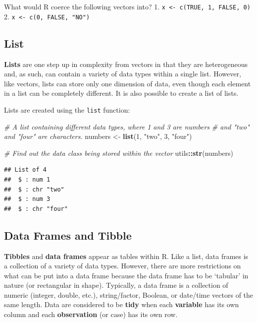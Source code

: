 \documentclass[
]{book}
\newenvironment{Shaded}{\begin{snugshade}}{\end{snugshade}}
\newcommand{\CommentTok}[1]{\textcolor[rgb]{0.56,0.35,0.01}{\textit{#1}}}
\newcommand{\DecValTok}[1]{\textcolor[rgb]{0.00,0.00,0.81}{#1}}
\newcommand{\FunctionTok}[1]{\textcolor[rgb]{0.13,0.29,0.53}{\textbf{#1}}}
\newcommand{\NormalTok}[1]{#1}
\newcommand{\OtherTok}[1]{\textcolor[rgb]{0.56,0.35,0.01}{#1}}
\newcommand{\SpecialCharTok}[1]{\textcolor[rgb]{0.81,0.36,0.00}{\textbf{#1}}}
\newcommand{\StringTok}[1]{\textcolor[rgb]{0.31,0.60,0.02}{#1}}
\begin{document}
What would R coerce the following vectors into?
1. \texttt{x\ \textless{}-\ c(TRUE,\ 1,\ FALSE,\ 0)}
2. \texttt{x\ \textless{}-\ c(0,\ FALSE,\ "NO")}

\subsection{List}\label{sec:list}

\textbf{Lists} are one step up in complexity from vectors in that they are heterogeneous and, as such, can contain a variety of data types within a single list. However, like vectors, lists can store only one dimension of data, even though each element in a list can be completely different. It is also possible to create a list of lists.

Lists are created using the \texttt{list} function:

\begin{Shaded}
\begin{Highlighting}[]
\CommentTok{\# A list containing different data types, where 1 and 3 are numbers}
\CommentTok{\# and "two" and "four" are characters.}
\NormalTok{numbers }\OtherTok{\textless{}{-}} \FunctionTok{list}\NormalTok{(}\DecValTok{1}\NormalTok{, }\StringTok{"two"}\NormalTok{, }\DecValTok{3}\NormalTok{, }\StringTok{"four"}\NormalTok{)}

\CommentTok{\# Find out the data class being stored within the vector}
\NormalTok{utils}\SpecialCharTok{::}\FunctionTok{str}\NormalTok{(numbers)}
\end{Highlighting}
\end{Shaded}

\begin{verbatim}
## List of 4
##  $ : num 1
##  $ : chr "two"
##  $ : num 3
##  $ : chr "four"
\end{verbatim}

\subsection{Data Frames and Tibble}\label{sec:tibbleAnddataFrame}

\textbf{Tibbles} and \textbf{data frames} appear as tables within R. Like a list, data frames is a collection of a variety of data types. However, there are more restrictions on what can be put into a data frame because the data frame has to be `tabular' in nature (or rectangular in shape). Typically, a data frame is a collection of numeric (integer, double, etc.), string/factor, Boolean, or date/time vectors of the same length. Data are considered to be \textbf{tidy} when each \textbf{variable} has its own column and each \textbf{observation} (or case) has its own row.
\end{document}
